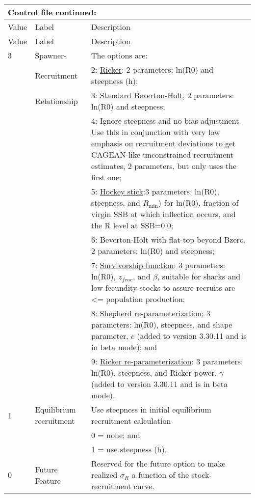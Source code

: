 \begin{longtable}{p{1cm} p{3cm} p{11cm}}
	\multicolumn{3}{l}{Control file continued:}\\
	\hline
	Value & Label &  Description\Tstrut\Bstrut\\
	\hline
	\endfirsthead

	\hline
	Value & Label &  Description\Tstrut\Bstrut\\
	\hline
	\endhead
	\hline
	\endfoot
	\endlastfoot

	3 & Spawner-            & The options are: \Tstrut\\
	  & Recruitment         & 2: \hyperlink{Ricker}{Ricker}: 2 parameters: ln(R0) and steepness (h); \\
	  & Relationship        & 3: \hyperlink{BH}{Standard Beverton-Holt}, 2 parameters: ln(R0) and steepness; \\
	  &                     & 4: Ignore steepness and no bias adjustment. Use this in conjunction with very low emphasis on recruitment deviations to get CAGEAN-like unconstrained recruitment estimates, 2 parameters, but only uses the first one;\\
	  &                     & 5: \hyperlink{Hockey}{Hockey stick}:3 parameters: ln(R0), steepness, and $R_{\text{min}}$) for ln(R0), fraction of virgin SSB at which inflection occurs, and the R level at SSB=0.0; \\
	  &                     & 6: Beverton-Holt with flat-top beyond Bzero, 2 parameters: ln(R0) and steepness;\\
	  &                     & 7: \hyperlink{Survivorship}{Survivorship function}: 3 parameters: ln(R0), $z_{frac}$, and $\beta$, suitable for sharks and low fecundity stocks to assure recruits are <= population production;\\
      & 					& 8: \hyperlink{Shepherd}{Shepherd re-parameterization}: 3 parameters: ln(R0), steepness, and shape parameter, $c$ (added to version 3.30.11 and is in beta mode); and\\
      & 					& 9: \hyperlink{Ricker2}{Ricker re-parameterization}: 3 parameters: ln(R0), steepness, and Ricker power, $\gamma$ (added to version 3.30.11 and is in beta mode).\Bstrut\\
    \hline

    1 \Tstrut & Equilibrium recruitment & Use steepness in initial equilibrium recruitment calculation \\
      & 						& 0 = none; and \\
      &							& 1 = use steepness (h). \\
    0 &  Future Feature         & Reserved for the future option to make realized $\sigma_R$ a function of the stock-recruitment curve.\Bstrut\\ 
    \hline
\end{longtable}

